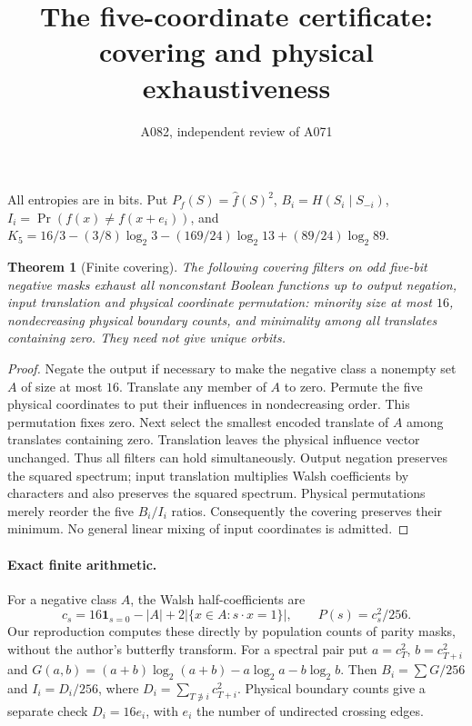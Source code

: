 \documentclass{article}
\newtheorem{theorem}{Theorem}
\begin{document}
\title{The five-coordinate certificate: covering and physical exhaustiveness}
\author{A082, independent review of A071}\maketitle
All entropies are in bits. Put $P_f(S)=\widehat f(S)^2$,
$B_i=H(S_i\mid S_{-i})$, $I_i=\Pr(f(x)\ne f(x+e_i))$,
and $K_5=16/3-(3/8)\log_2 3-(169/24)\log_2 13+(89/24)\log_2 89$.

\begin{theorem}[Finite covering]
The following covering filters on odd five-bit negative masks exhaust all
nonconstant Boolean functions up to output negation, input translation and
physical coordinate permutation: minority size at most $16$, nondecreasing
physical boundary counts, and minimality among all translates containing zero.
They need not give unique orbits.
\end{theorem}
\begin{proof}
Negate the output if necessary to make the negative class a nonempty set $A$
of size at most $16$. Translate any member of $A$ to zero. Permute the five
physical coordinates to put their influences in nondecreasing order. This
permutation fixes zero. Next select the smallest encoded translate of $A$
among translates containing zero. Translation leaves the physical influence
vector unchanged. Thus all filters can hold simultaneously. Output negation
preserves the squared spectrum; input translation multiplies Walsh
coefficients by characters and also preserves the squared spectrum.
Physical permutations merely reorder the five $B_i/I_i$ ratios.
Consequently the covering preserves their minimum. No general linear mixing
of input coordinates is admitted.
\end{proof}

\paragraph{Exact finite arithmetic.}
For a negative class $A$, the Walsh half-coefficients are
\[
 c_s=16\mathbf1_{s=0}-|A|+2|\{x\in A:s\cdot x=1\}|,
 \qquad P(s)=c_s^2/256.
\]
Our reproduction computes these directly by population counts of parity masks,
without the author's butterfly transform. For a spectral pair put $a=c_T^2$,
$b=c_{T+i}^2$ and $G(a,b)=(a+b)\log_2(a+b)-a\log_2 a-b\log_2 b$.
Then $B_i=\sum G/256$ and $I_i=D_i/256$, where
$D_i=\sum_{T\not\ni i}c_{T+i}^2$. Physical boundary counts give a separate
check $D_i=16 e_i$, with $e_i$ the number of undirected crossing edges.
\end{document}
